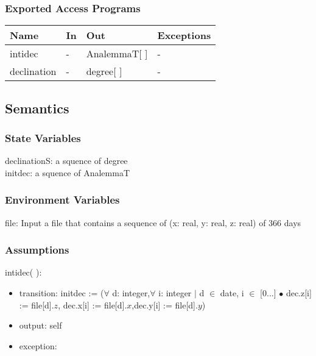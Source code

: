 \documentclass[12pt, titlepage]{article}
\begin{document}
\subsubsection{Exported Access Programs}

\begin{center}
\begin{tabular}{p{2cm} p{4cm} p{4cm} p{2cm}}
\hline
\textbf{Name} & \textbf{In} & \textbf{Out} & \textbf{Exceptions} \\
\hline 
intidec & - & AnalemmaT[ ] & -\\
declination & - & degree[ ] & - \\

\hline
\end{tabular}
\end{center}


\subsection{Semantics}

\subsubsection{State Variables}

declinationS: a squence of degree\\
initdec: a squence of AnalemmaT

\subsubsection{Environment Variables}

file: Input a file that contains a sequence of (x: real, y: real, z: real) of 366 days



\subsubsection{Assumptions}



\noindent  intidec( ):
\begin{itemize}
\item transition: initdec := ($\forall$ d: integer,$\forall$ i: integer $|$ d $\in$ date, i $\in$  [0...] $\bullet$ dec.z[i] := file[d].$z$, dec.x[i] := file[d].$x$,dec.y[i] := file[d].$y$)

\item output: self
\item exception: 
\end{itemize}
\end{document}
